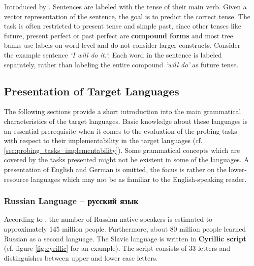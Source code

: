   Introduced by \citep{Conneau.2018a}. Sentences are labeled with the tense of their main verb. Given a vector representation of the sentence, the goal is to predict the correct tense. The task is often restricted to present tense and simple past, since other tenses like future, present perfect or past perfect are \textbf{compound forms} and most tree banks use labels on word level and do not consider larger constructs. Consider the example sentence \textit{`I will do it.'}: Each word in the sentence is labeled separately, rather than labeling the entire compound \textit{`will do'} as future tense.

\subsection{Presentation of Target Languages}
\label{sec:presentation_languages}

The following sections provide a short introduction into the main grammatical characteristics of the target languages. Basic knowledge about these languages is an essential prerequisite when it comes to the evaluation of the probing tasks with respect to their implementability in the target languages (cf. \vref{sec:probing_tasks_implementability}). Some grammatical concepts which are covered by the tasks presented might not be existent in some of the languages. A presentation of English and German is omitted, the focus is rather on the lower-resource languages which may not be as familiar to the English-speaking reader.

\subsubsection{Russian Language -- \foreignlanguage{russian}{русский язык}}
\label{sec:russian_language}

According to \citep{Reuther.2009}, the number of Russian native speakers is estimated to approximately 145 million people. Furthermore, about 80 million people learned Russian as a second language. The Slavic language is written in \textbf{Cyrillic script} (cf. figure \vref{fig:cyrillic} for an example). The script consists of 33 letters and distinguishes between upper and lower case letters.

